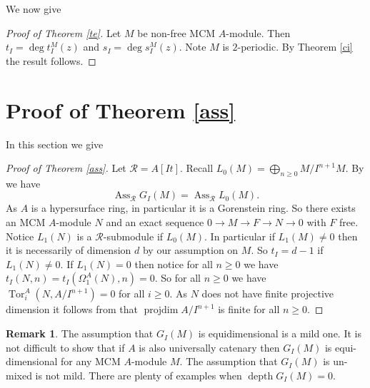 \documentclass{amsart}
\newcommand{\R}{\mathcal{R} }
\newcommand{\rt}{\rightarrow}
\newcommand{\projdim}{\operatorname{projdim}}
\newcommand{\depth}{\operatorname{depth}}
\newcommand{\Tor}{\operatorname{Tor}}
\newcommand{\Ass}{\operatorname{Ass}}
\theoremstyle{plain}
\theoremstyle{definition}
\newtheorem{remark}[theorem]{Remark}
\theoremstyle{remark}
\begin{document}
We now give
\begin{proof}[Proof of Theorem \ref{te}]
Let $M$ be non-free MCM $A$-module. Then $t_I = \deg t^M_I(z)$ and $s_I = \deg s^M_I(z).$ Note $M$ is $2$-periodic. By Theorem \ref{ci} the result follows.
\end{proof}

\section{Proof of Theorem \ref{ass}}
In this section we give
\begin{proof}[Proof of Theorem \ref{ass}]
Let $\R = A[It]$.  Recall $L_0(M) = \bigoplus_{n \geq 0}M/I^{n+1}M$. By \cite[5.6]{P3} we have
$$\Ass_\R G_I(M) = \Ass_\R L_0(M).$$
As $A$ is a hypersurface ring, in particular it is a Gorenstein ring. So there exists an MCM $A$-module $N$ and an exact sequence $0 \rt M \rt F \rt N \rt 0$ with $F$ free.
Notice $L_1(N)$ is a $\R$-submodule if $L_0(M)$. In particular if $L_1(M) \neq 0$ then it is necessarily of dimension $d$ by our assumption on $M$. So $t_I = d - 1$ if $L_1(N) \neq 0$.
If $L_1(N) = 0$ then notice for all $n \geq 0$ we have $t_I(N,n) = t_I(\Omega^A_1(N), n) = 0$. So for all $n \geq 0$ we have $\Tor^A_i(N, A/I^{n+1}) = 0$ for all $i \geq 0$. As $N$ does not have finite projective dimension it follows from \cite[1.9]{HW} that $\projdim A/I^{n+1} $ is finite for all $n \geq 0$.
\end{proof}

\begin{remark}
The assumption that $G_I(M)$ is equidimensional is a mild one. It is not difficult to show that if $A$ is also universally catenary then $G_I(M)$ is equi-dimensional for any MCM $A$-module $M$.
The assumption that $G_I(M)$ is un-mixed is not mild. There are plenty of examples when $\depth G_I(M) = 0$.
\end{remark}
\end{document}
